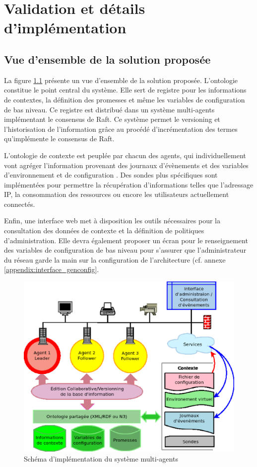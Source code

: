 \chapter{Validation et détails d'implémentation}

\section{Vue d'ensemble de la solution proposée}

La figure \ref{fig:archi} présente un vue d'ensemble de la solution proposée.
L'ontologie constitue le point central du système. Elle sert de registre pour
les informations de contextes, la définition des promesses et même les variables
de configuration de bas niveau.  Ce registre est distribué dans un système
multi-agents implémentant le consensus de Raft. Ce système permet le versioning
et l'historisation de l'information grâce au procédé d'incrémentation des termes
qu'implémente le consensus de Raft.

L'ontologie de contexte est peuplée par chacun des agents, qui individuellement
vont agréger l'information provenant des journaux d'évènements et des variables
d'environnement et de configuration . Des sondes plus spécifiques sont
implémentées pour permettre la récupération d'informations telles que
l'adressage IP, la consommation des ressources ou encore les utilisateurs
actuellement connectés. 

Enfin, une interface web met à disposition les outils nécessaires pour la
consultation des données de contexte et la définition de politiques
d'administration. Elle devra également proposer un écran pour le renseignement
des variables de configuration de bas niveau pour s'assurer que l'administrateur
du réseau garde la main sur la configuration de l'architecture (cf. annexe
\ref{appendix:interface_genconfig}.

\begin{figure}[H]
    \centering
    \includegraphics[width=.67\textwidth]{img/archi}
    \caption{Schéma d'implémentation du système multi-agents}
    \label{fig:archi}
\end{figure}

